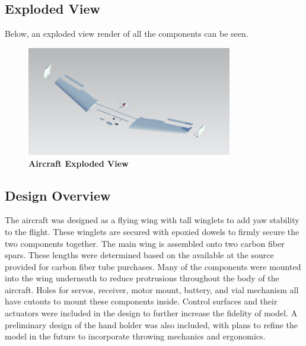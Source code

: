     \subsection{Exploded View}
    Below, an exploded view render of all the components can be seen. 
    \begin{figure}[H]
            \centering
            \includegraphics[width=0.8\textwidth]{homeworks/homework4/report/Figure/aircraft_assembly_exploded.png}
            \caption{\textbf{Aircraft Exploded View}}
            \label{fig:exploded}
        \end{figure}
    
    
    \subsection{Design Overview}
    
        The aircraft was designed as a flying wing with tall winglets to add yaw stability to the flight. These winglets are secured with epoxied dowels to firmly secure the two components together. The main wing is assembled onto two carbon fiber spars. These lengths were determined based on the available at the source provided for carbon fiber tube purchases. Many of the components were mounted into the wing underneath to reduce protrusions throughout the body of the aircraft. Holes for servos, receiver, motor mount, battery, and vial mechanism all have cutouts to mount these components inside. Control surfaces and their actuators were included in the design to further increase the fidelity of model. A preliminary design of the hand holder was also included, with plans to refine the model in the future to incorporate throwing mechanics and ergonomics.

